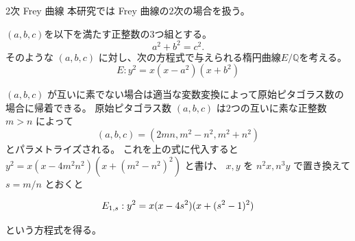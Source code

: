 \documentclass{classes/mybeamer}
\begin{document}


\begin{frame}{2次 Frey 曲線}
    本研究では Frey 曲線の$2$次の場合を扱う。
    \begin{dfn*}
        $(a,b,c)$を以下を満たす正整数の$3$つ組とする。
        \begin{equation}
            \label{eq:pythagorean_triple}
            a^2+b^2=c^2.
        \end{equation}
        そのような $(a,b,c)$ に対し、次の方程式で与えられる楕円曲線$E/\mathbb{Q}$を考える。
        \begin{equation}
            \label{eq:2frey}
            E: y^2 = x (x-a^2) (x+b^2)
        \end{equation}
    \end{dfn*}
    $(a,b,c)$ が互いに素でない場合は適当な変数変換によって原始ピタゴラス数の場合に帰着できる。
    原始ピタゴラス数 $(a,b,c)$ は$2$つの互いに素な正整数 $m > n$ によって
    \begin{equation*}
        (a,b,c) = (2mn, m^{2} - n^{2}, m^{2} + n^{2})
    \end{equation*}
    とパラメトライズされる。
    これを上の式に代入すると $y^{2} = x(x - 4m^2n^2)(x + (m^{2} - n^2)^{2})$ と書け、
    $x,y$ を $n^2x, n^3y$ で置き換えて $s = m/n$ とおくと
    \begin{eg*}
        \begin{equation*}
            \label{eq:E_{1,s}}
            E_{1,s}: y^{2} = x(x - 4s^{2})(x + (s^{2} - 1)^{2})
        \end{equation*}
    \end{eg*}
    という方程式を得る。    
\end{frame}
\end{document}
